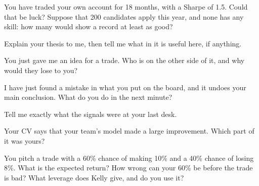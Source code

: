 \begin{question}\label{iq:iv2:your-strategy-and-your-project:6}
You have traded your own account for 18 months, with a Sharpe of 1.5. Could that be luck? Suppose that 200 candidates apply this year, and none has any skill: how many would show a record at least as good?
\end{question}

\begin{question}\label{iq:iv2:your-strategy-and-your-project:7}
Explain your thesis to me, then tell me what in it is useful here, if anything.
\end{question}

\begin{question}\label{iq:iv2:your-strategy-and-your-project:8}
You just gave me an idea for a trade. Who is on the other side of it, and why would they lose to you?
\end{question}

\begin{question}\label{iq:iv2:your-strategy-and-your-project:9}
I have just found a mistake in what you put on the board, and it undoes your main conclusion. What do you do in the next minute?
\end{question}

\begin{question}\label{iq:iv2:your-strategy-and-your-project:10}
Tell me exactly what the signals were at your last desk.
\end{question}

\begin{question}\label{iq:iv2:your-strategy-and-your-project:11}
Your CV says that your team's model made a large improvement. Which part of it was yours?
\end{question}

\begin{question}\label{iq:iv2:your-strategy-and-your-project:12}
You pitch a trade with a 60\% chance of making 10\% and a 40\% chance of losing 8\%. What is the expected return? How wrong can your 60\% be before the trade is bad? What leverage does Kelly give, and do you use it?
\end{question}

